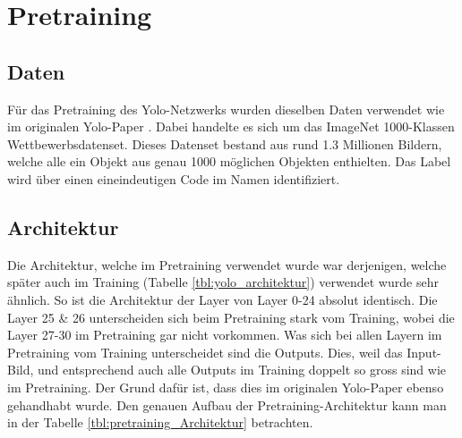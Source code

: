 \newpage
\section{Pretraining}
\label{chapter:Pretraining}

\subsection{Daten}
Für das Pretraining des Yolo-Netzwerks wurden dieselben Daten verwendet wie im originalen Yolo-Paper \cite{yolo}.
Dabei handelte es sich um das ImageNet 1000-Klassen Wettbewerbsdatenset.
Dieses Datenset bestand aus rund 1.3 Millionen Bildern, welche alle ein Objekt aus genau 1000 möglichen Objekten enthielten.
Das Label wird über einen eineindeutigen Code im Namen identifiziert.
\subsection{Architektur}
Die Architektur, welche im Pretraining verwendet wurde war derjenigen, welche später auch im Training (Tabelle \ref{tbl:yolo_architektur}) verwendet wurde sehr ähnlich.
So ist die Architektur der Layer von Layer 0-24 absolut identisch. 
Die Layer 25 \& 26 unterscheiden sich beim Pretraining stark vom Training, wobei die Layer 27-30 im Pretraining gar nicht vorkommen.
Was sich bei allen Layern im Pretraining vom Training unterscheidet sind die Outputs. 
Dies, weil das Input-Bild, und entsprechend auch alle Outputs im Training doppelt so gross sind wie im Pretraining. 
Der Grund dafür ist, dass dies im originalen Yolo-Paper \cite{yolo} ebenso gehandhabt wurde.
Den genauen Aufbau der Pretraining-Architektur kann man in der Tabelle \ref{tbl:pretraining_Architektur} betrachten.
